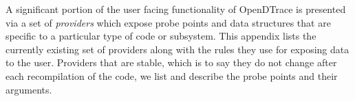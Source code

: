 A significant portion of the user facing functionality of OpenDTrace
is presented via a set of \emph{providers} which expose probe points
and data structures that are specific to a particular type of
code or subsystem.  This appendix lists the currently existing set of
providers along with the rules they use for exposing data to the user.
Providers that are stable, which is to say they do not change after
each recompilation of the code, we list and describe the probe points
and their arguments.


